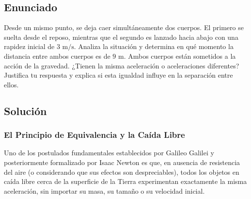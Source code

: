 \documentclass[12pt, a4paper]{article}
\begin{document}
\newpage

\subsection*{Enunciado}

Desde un mismo punto, se deja caer simultáneamente dos cuerpos. El primero se suelta desde el reposo, mientras que el segundo es lanzado hacia abajo con una rapidez inicial de $3 \text{ m/s}$. Analiza la situación y determina en qué momento la distancia entre ambos cuerpos es de $9 \text{ m}$. Ambos cuerpos están sometidos a la acción de la gravedad. ¿Tienen la misma aceleración o aceleraciones diferentes? Justifica tu respuesta y explica si esta igualdad influye en la separación entre ellos.

\vspace{0.5cm}

\begin{center}
\end{center}

\subsection*{Solución}

\subsubsection*{El Principio de Equivalencia y la Caída Libre}

Uno de los postulados fundamentales establecidos por Galileo Galilei y posteriormente formalizado por Isaac Newton es que, en ausencia de resistencia del aire (o considerando que sus efectos son despreciables), todos los objetos en caída libre cerca de la superficie de la Tierra experimentan exactamente la misma aceleración, sin importar su masa, su tamaño o su velocidad inicial.
\end{document}
